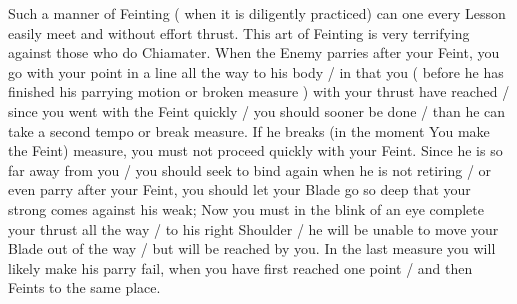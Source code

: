 \newpage


\newpage



Such a manner  of Feinting ( when it is diligently practiced) can one
every Lesson easily meet and without effort thrust. This art of
Feinting is very terrifying against those who do Chiamater. When the
Enemy parries after your Feint, you go with your point in a line all
the way to his body / in that you ( before he has finished his
parrying motion or broken measure ) with your thrust have reached /
since you went with the Feint quickly / you should sooner be done /
than he can take a second tempo or break measure. If he breaks (in the
moment You make the Feint) measure, you must not proceed quickly with
your Feint. Since he is so far away from you / you should seek to bind
again when he is not retiring / or even parry after your Feint, you
should let your Blade go so deep that your strong comes against his
weak; Now you must in the blink of an eye complete your thrust all the
way / to his right Shoulder / he will be unable to move your Blade out
of the way / but will be reached by you. In the last measure you will
likely make his parry fail, when you have first reached one point /
and then Feints to the same place.


% 